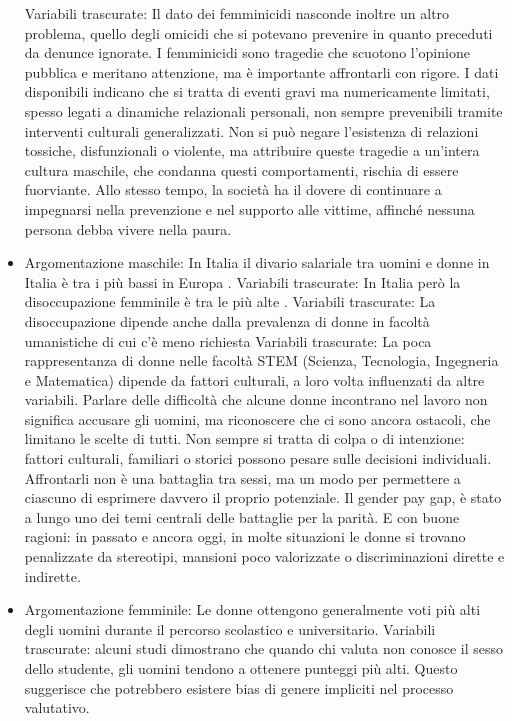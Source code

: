 \documentclass[12pt]{book} %
\begin{document}
\begin{mdframed}[linewidth=1pt]
\begin{itemize}
Variabili trascurate: Il dato dei femminicidi nasconde inoltre un altro problema, quello degli omicidi che si potevano prevenire in quanto preceduti da denunce ignorate. I femminicidi sono tragedie che scuotono l’opinione pubblica e meritano attenzione, ma è importante affrontarli con rigore. I dati disponibili indicano che si tratta di eventi gravi ma numericamente limitati, spesso legati a dinamiche relazionali personali, non sempre prevenibili tramite interventi culturali generalizzati.
Non si può negare l’esistenza di relazioni tossiche, disfunzionali o violente, ma attribuire queste tragedie a un’intera cultura maschile, che condanna questi comportamenti, rischia di essere fuorviante. Allo stesso tempo, la società ha il dovere di continuare a impegnarsi nella prevenzione e nel supporto alle vittime, affinché nessuna persona debba vivere nella paura.
\item Argomentazione maschile: In Italia il divario salariale tra uomini e donne in Italia è tra i più bassi in Europa .
Variabili trascurate: In Italia però la disoccupazione femminile è tra le più alte .
Variabili trascurate: La disoccupazione dipende anche dalla prevalenza di donne in facoltà umanistiche di cui c'è meno richiesta
Variabili trascurate: La poca rappresentanza di donne nelle facoltà STEM (Scienza, Tecnologia, Ingegneria e Matematica) dipende da fattori culturali, a loro volta influenzati da altre variabili.
Parlare delle difficoltà che alcune donne incontrano nel lavoro non significa accusare gli uomini, ma riconoscere che ci sono ancora ostacoli, che limitano le scelte di tutti. Non sempre si tratta di colpa o di intenzione: fattori culturali, familiari o storici possono pesare sulle decisioni individuali. Affrontarli non è una battaglia tra sessi, ma un modo per permettere a ciascuno di esprimere davvero il proprio potenziale.
Il gender pay gap, è stato a lungo uno dei temi centrali delle battaglie per la parità. E con buone ragioni: in passato e ancora oggi, in molte situazioni le donne si trovano penalizzate da stereotipi, mansioni poco valorizzate o discriminazioni dirette e indirette.
\item Argomentazione femminile: Le donne ottengono generalmente voti più alti degli uomini durante il percorso scolastico e universitario. 
Variabili trascurate: alcuni studi dimostrano che quando chi valuta non conosce il sesso dello studente, gli uomini tendono a ottenere punteggi più alti. Questo suggerisce che potrebbero esistere bias di genere impliciti nel processo valutativo.

\end{itemize}
\end{mdframed}
\end{document}
